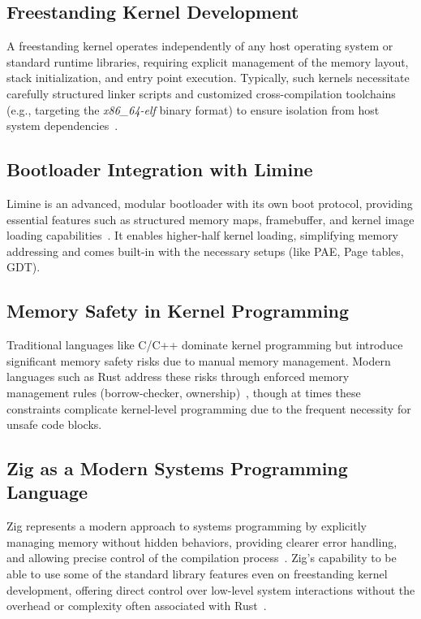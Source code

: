 \documentclass[12pt]{extarticle}
\begin{document}
\subsection{Freestanding Kernel Development}

A freestanding kernel operates independently of any host operating system or
standard runtime libraries, requiring explicit management of the memory layout,
stack initialization, and entry point execution. Typically, such kernels
necessitate carefully structured linker scripts and customized cross-compilation
toolchains (e.g., targeting the \textit{x86\_64-elf} binary format) to ensure
isolation from host system dependencies~\cite{osdev2025}.

\subsection{Bootloader Integration with Limine}

Limine is an advanced, modular bootloader with its own boot protocol, providing
essential features such as structured memory maps, framebuffer, and kernel image
loading capabilities~\cite{limine_bootloader}. It enables higher-half kernel loading, simplifying memory
addressing and comes built-in with the necessary setups (like PAE, Page tables,
GDT).

\subsection{Memory Safety in Kernel Programming}

Traditional languages like C/C++ dominate kernel programming but introduce
significant memory safety risks due to manual memory management. Modern
languages such as Rust address these risks through enforced memory management
rules (borrow-checker, ownership)~\cite{rustsafety}, though at times these
constraints complicate kernel-level programming due to the frequent necessity
for unsafe code blocks.

\subsection{Zig as a Modern Systems Programming Language}

Zig represents a modern approach to systems programming by explicitly managing
memory without hidden behaviors, providing clearer error handling, and allowing
precise control of the compilation process~\cite{ziglang}. Zig's capability to
be able to use some of the standard library features even on freestanding kernel
development, offering direct control over low-level system interactions without
the overhead or complexity often associated with Rust~\cite{radisic_zig_vs_rust}.
\end{document}
